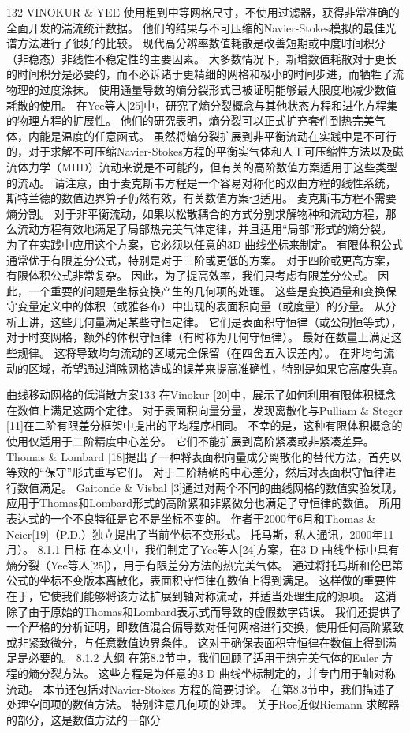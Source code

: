 \documentclass[UTF8,11pt,a4paper,openany,fontset=fandol]{ctexbook}
\begin{document}
132 VINOKUR \& YEE 使用粗到中等网格尺寸，不使用过滤器，获得非常准确的全面开发的湍流统计数据。 他们的结果与不可压缩的Navier-Stokes模拟的最佳光谱方法进行了很好的比较。 现代高分辨率数值耗散是改善短期或中度时间积分（非稳态）非线性不稳定性的主要因素。 大多数情况下，新增数值耗散对于更长的时间积分是必要的，而不必诉诸于更精细的网格和极小的时间步进，而牺牲了流物理的过度涂抹。 使用通量导数的熵分裂形式已被证明能够最大限度地减少数值耗散的使用。 在Yee等人[25]中，研究了熵分裂概念与其他状态方程和进化方程集的物理方程的扩展性。 他们的研究表明，熵分裂可以正式扩充套件到热完美气体，内能是温度的任意函式。 虽然将熵分裂扩展到非平衡流动在实践中是不可行的，对于求解不可压缩Navier-Stokes方程的平衡实气体和人工可压缩性方法以及磁流体力学（MHD）流动来说是不可能的，但有关的高阶数值方案适用于这些类型的流动。 请注意，由于麦克斯韦方程是一个容易对称化的双曲方程的线性系统，斯特兰德的数值边界算子仍然有效，有关数值方案也适用。 麦克斯韦方程不需要熵分割。 对于非平衡流动，如果以松散耦合的方式分别求解物种和流动方程，那么流动方程有效地满足了局部热完美气体定律，并且适用“局部”形式的熵分裂。 为了在实践中应用这个方案，它必须以任意的3D 曲线坐标来制定。 有限体积公式通常优于有限差分公式，特别是对于三阶或更低的方案。 对于四阶或更高方案，有限体积公式非常复杂。 因此，为了提高效率，我们只考虑有限差分公式。 因此，一个重要的问题是坐标变换产生的几何项的处理。 这些是变换通量和变换保守变量定义中的体积（或雅各布）中出现的表面积向量（或度量）的分量。 从分析上讲，这些几何量满足某些守恒定律。 它们是表面积守恒律（或公制恒等式），对于时变网格，额外的体积守恒律（有时称为几何守恒律）。 最好在数量上满足这些规律。 这将导致均匀流动的区域完全保留（在四舍五入误差内）。 在非均匀流动的区域，希望通过消除网格造成的误差来提高准确性，特别是如果它高度失真。

曲线移动网格的低消散方案133 在Vinokur [20]中，展示了如何利用有限体积概念在数值上满足这两个定律。 对于表面积向量分量，发现离散化与Pulliam \& Steger [11]在二阶有限差分框架中提出的平均程序相同。 不幸的是，这种有限体积概念的使用仅适用于二阶精度中心差分。 它们不能扩展到高阶紧凑或非紧凑差异。 Thomas \& Lombard [18]提出了一种将表面积向量成分离散化的替代方法，首先以等效的“保守”形式重写它们。 对于二阶精确的中心差分，然后对表面积守恒律进行数值满足。 Gaitonde \& Visbal [3]通过对两个不同的曲线网格的数值实验发现，应用于Thomas和Lombard形式的高阶紧和非紧微分也满足了守恒律的数值。 所用表达式的一个不良特征是它不是坐标不变的。 作者于2000年6月和Thomas \& Neier[19]（P.D.）独立提出了当前坐标不变形式。 托马斯，私人通讯，2000年11月）。 8.1.1 目标 在本文中，我们制定了Yee等人[24]方案，在3-D 曲线坐标中具有熵分裂（Yee等人[25]），用于有限差分方法的热完美气体。 通过将托马斯和伦巴第公式的坐标不变版本离散化，表面积守恒律在数值上得到满足。 这样做的重要性在于，它使我们能够将该方法扩展到轴对称流动，并适当处理生成的源项。 这消除了由于原始的Thomas和Lombard表示式而导致的虚假数字错误。 我们还提供了一个严格的分析证明，即数值混合偏导数对任何网格进行交换，使用任何高阶紧致或非紧致微分，与任意数值边界条件。 这对于确保表面积守恒律在数值上得到满足是必要的。 8.1.2 大纲 在第8.2节中，我们回顾了适用于热完美气体的Euler 方程的熵分裂方法。 这些方程是为任意的3-D 曲线坐标制定的，并专门用于轴对称流动。 本节还包括对Navier-Stokes 方程的简要讨论。 在第8.3节中，我们描述了处理空间项的数值方法。 特别注意几何项的处理。 关于Roe近似Riemann 求解器的部分，这是数值方法的一部分
\end{document}
